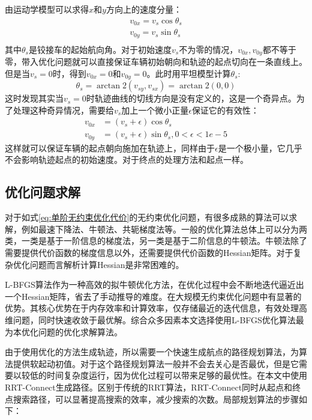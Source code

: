 \documentclass[master,academic]{ysuthesis} %
\begin{document}
		由运动学模型可以求得$x$和$y$方向上的速度分量：
		\begin{equation}
			\begin{aligned}
				v_{0x}=v_s\cos\theta _s\\
				v_{0y}=v_s\sin\theta _s\\
			\end{aligned}
		\end{equation}
		其中$\theta_s$是铰接车的起始航向角。对于初始速度$v_s$不为零的情况，$v_{0x},v_{0y}$都不等于零，带入优化问题就可以直接保证车辆初始朝向和轨迹的起点切向在一条直线上。但是当$v_{s}=0$时，得到$v_{0x}=0$和$v_{0y}=0$。此时用平坦模型计算$\theta_s$:
		\begin{equation}
			\theta_s=\arctan2 \left( v_{sy},v_{sx} \right) =\arctan2\left( 0,0 \right) 
		\end{equation}
		这时发现其实当$v_{s}=0$时轨迹曲线的切线方向是没有定义的，这是一个奇异点。为了处理这种奇异情况，需要给$v_{s}$加上一个微小正量$\epsilon$保证它的有效性：
		\begin{equation}
			\begin{aligned}
			v_{0x}&=\left( v_s+\epsilon \right) \cos\theta_s\\
			v_{0y}&=\left( v_s+\epsilon \right) \sin\theta_s,0<\epsilon <1e-5
			\end{aligned}
		\end{equation}
		这样就可以保证车辆的起点朝向施加在轨迹上，同样由于$\epsilon$是一个极小量，它几乎不会影响轨迹起点的初始速度。对于终点的处理方法和起点一样。

		\subsection{优化问题求解}
		对于如式\ref{eq:单阶无约束优化代价}的无约束优化问题，有很多成熟的算法可以求解，例如最速下降法、牛顿法、共轭梯度法等。一般的优化算法总体上可以分为两类，一类是基于一阶信息的梯度法，另一类是基于二阶信息的牛顿法。牛顿法除了需要提供代价函数的梯度信息以外，还需要提供代价函数的Hessian矩阵。对于复杂优化问题而言解析计算Hessian是非常困难的。
		
		L-BFGS算法作为一种高效的拟牛顿优化方法，在优化过程中会不断地迭代逼近出一个Hessian矩阵，省去了手动推导的难度。在大规模无约束优化问题中有显著的优势。其核心优势在于内存效率和计算效率，仅存储最近的迭代信息，有效处理高维问题，同时快速收敛于最优解。综合众多因素本文选择使用L-BFGS优化算法最为本优化问题的优化求解算法。

		由于使用优化的方法生成轨迹，所以需要一个快速生成航点的路径规划算法，为算法提供软起动初值。对于这个路径规划算法一般并不会去关心是否最优，但是它需要以较低的时间复杂度运行，因为优化过程可以带来足够的最优性。在本文中使用RRT-Connect生成路径。区别于传统的RRT算法，RRT-Connect同时从起点和终点搜索路径，可以显著提高搜索的效率，减少搜索的次数。局部规划算法的步骤如下：
\end{document}
